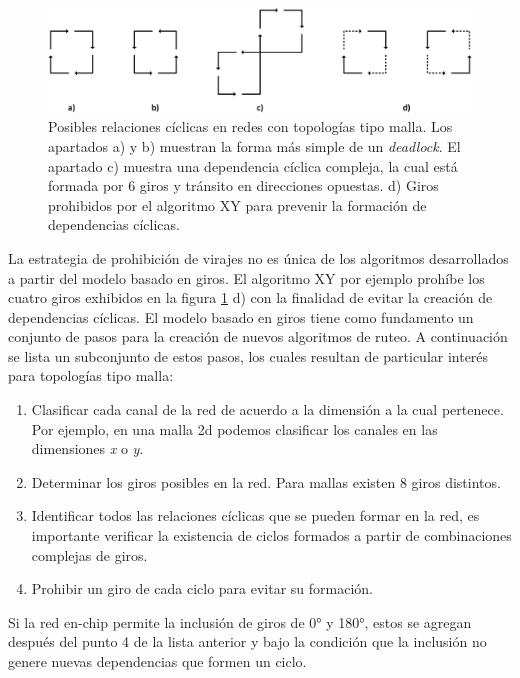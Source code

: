 \begin{figure}
	\begin{center}
		\includegraphics[scale=0.6]{figures/ch2_giros_deadlock.png}
	\end{center}
	\caption
		{	
			Posibles relaciones cíclicas en redes con topologías tipo malla. Los apartados a) y b) muestran la forma más simple de un \textit{deadlock}. El apartado c) muestra una dependencia cíclica compleja, la cual está formada por 6 giros y tránsito en direcciones opuestas. d) Giros prohibidos por el algoritmo XY para prevenir la formación de dependencias cíclicas.
		}
	\label{fig:ch2_giros_deadlock}
\end{figure}

La estrategia de prohibición de virajes no es única de los algoritmos desarrollados a partir del modelo basado en giros. El algoritmo XY\cite{chapter2:Shubhangi:2012} por ejemplo prohíbe los cuatro giros exhibidos en la figura \ref{fig:ch2_giros_deadlock} d) con la finalidad de evitar la creación de dependencias cíclicas. El modelo basado en giros tiene como fundamento un conjunto de pasos para la creación de nuevos algoritmos de ruteo. A continuación se lista un subconjunto de estos pasos, los cuales resultan de particular interés para topologías tipo malla:

\begin{enumerate}
	\item Clasificar cada canal de la red de acuerdo a la dimensión a la cual pertenece. Por ejemplo, en una malla 2d podemos clasificar los canales en las dimensiones \textit{x} o \textit{y}.
	\item Determinar los giros posibles en la red. Para mallas existen 8 giros distintos.
	\item Identificar todos las relaciones cíclicas que se pueden formar en la red, es importante verificar la existencia de ciclos formados a partir de combinaciones complejas de giros.
	\item Prohibir un giro de cada ciclo para evitar su formación.
\end{enumerate}

Si la red en-chip permite la inclusión de giros de 0° y 180°, estos se agregan después del punto 4 de la lista anterior y bajo la condición que la inclusión no genere nuevas dependencias que formen un ciclo.

